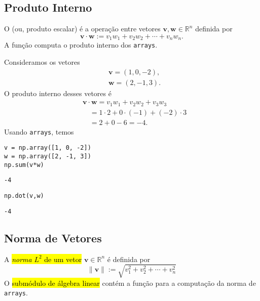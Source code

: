 \subsection{Produto Interno}

O  (ou, produto escalar) é a operação entre vetores $\pmb{v},\pmb{w}\in\mathbb{R}^n$ definida por
\begin{equation}
  \pmb{v}\cdot\pmb{w} := v_1w_1+v_2w_2+\cdots+v_nw_n.
\end{equation}
A função {\PYTHONnumpyDOTdot} computa o produto interno dos \texttt{arrays}.

\begin{ex}
  Consideramos os vetores
  \begin{align}
    & \pmb{v} = (1, 0, -2), \\
    & \pmb{w} = (2, -1, 3).
  \end{align}
  O produto interno desses vetores é
  \begin{align}
  & \pmb{v}\cdot\pmb{w} = v_1w_1 + v_2w_2 + v_3w_3 \\
  & \text{}\quad = 1\cdot 2 + 0\cdot(-1) + (-2)\cdot 3 \\
  & \text{}\quad = 2 + 0 -6 = -4.
  \end{align}
  Usando \texttt{arrays}, temos

\begin{lstlisting}
v = np.array([1, 0, -2])
w = np.array([2, -1, 3])
np.sum(v*w)
\end{lstlisting}

\begin{verbatim}
-4
\end{verbatim}

\begin{lstlisting}
np.dot(v,w)
\end{lstlisting}

\begin{verbatim}
-4
\end{verbatim}

\end{ex}

\subsection{Norma de Vetores}

A \hl{\emph{norma} $L^2$ de um vetor} $\pmb{v}\in\mathbb{R}^n$ é definida por
\begin{equation}
  \|\pmb{v}\| := \sqrt{v_1^2+v_2^2+\cdots+v_n^2}
\end{equation}
O \hl{submódulo de álgebra linear} {\PYTHONnumpyDOTlinalg} contém a função {\PYTHONnumpyDOTlinalgDOTnorm} para a computação da norma de \texttt{arrays}.

